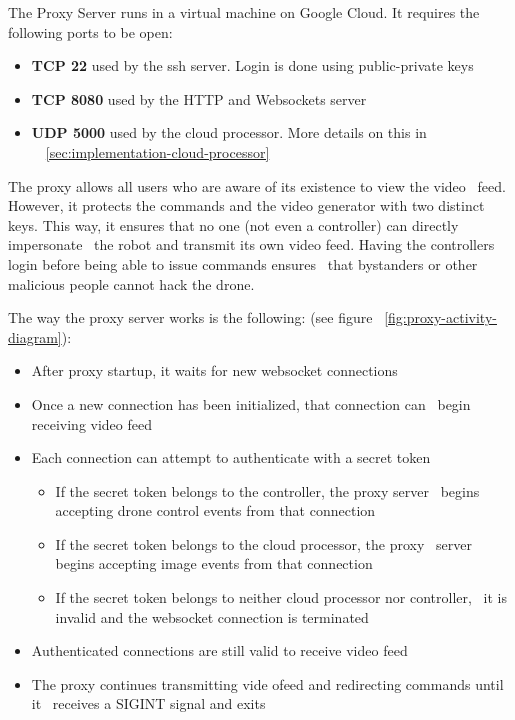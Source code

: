 The Proxy Server runs in a virtual machine on Google Cloud.
It requires the following ports to be open:
\begin{itemize}
    \item \textbf{TCP 22} used by the ssh server. Login is done using public-private keys
    \item \textbf{TCP 8080} used by the HTTP and Websockets server
    \item \textbf{UDP 5000} used by the cloud processor. More details on this in \
            ~\ref{sec:implementation-cloud-processor}
\end{itemize}

The proxy allows all users who are aware of its existence to view the video \
feed.
However, it protects the commands and the video generator with two distinct keys.
This way, it ensures that no one (not even a controller) can directly impersonate \
the robot and transmit its own video feed.
Having the controllers login before being able to issue commands ensures \
that bystanders or other malicious people cannot hack the drone.

The way the proxy server works is the following: (see figure ~\ref{fig:proxy-activity-diagram}):
\begin{itemize}
    \item After proxy startup, it waits for new websocket connections
    \item Once a new connection has been initialized, that connection can \
            begin receiving video feed
    \item Each connection can attempt to authenticate with a secret token
        \begin{itemize}
            \item If the secret token belongs to the controller, the proxy server \
                    begins accepting drone control events from that connection
            \item If the secret token belongs to the cloud processor, the proxy \
                    server begins accepting image events from that connection
            \item If the secret token belongs to neither cloud processor nor controller, \
                    it is invalid and the websocket connection is terminated
        \end{itemize}
    \item Authenticated connections are still valid to receive video feed
    \item The proxy continues transmitting vide ofeed and redirecting commands until it \
            receives a SIGINT signal and exits
\end{itemize}

